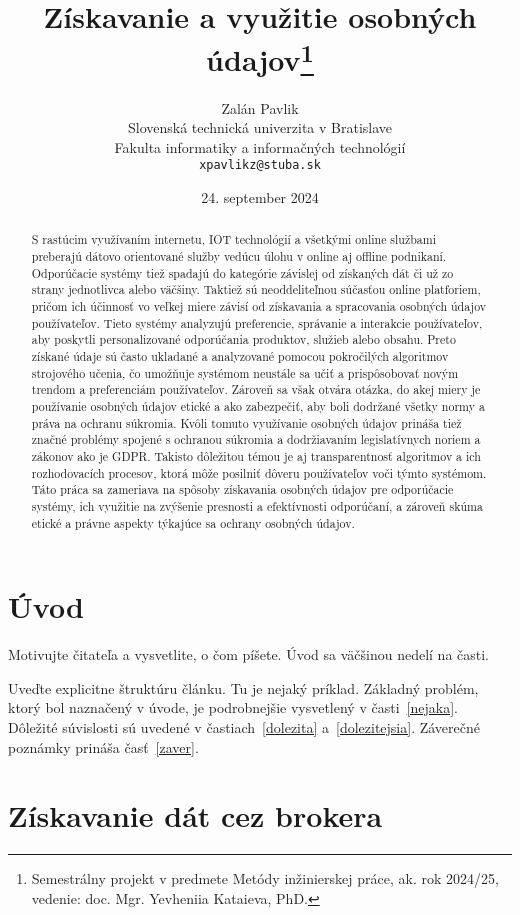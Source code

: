 \documentclass[10pt,twoside,slovak,a4paper]{article}
\title{Získavanie a využitie osobných údajov\thanks{Semestrálny projekt v predmete Metódy inžinierskej práce, ak. rok 2024/25, vedenie: doc. Mgr. Yevheniia Kataieva, PhD.}} %
\author{Zalán Pavlik\\[2pt]
	{\small Slovenská technická univerzita v Bratislave}\\
	{\small Fakulta informatiky a informačných technológií}\\
	{\small \texttt{xpavlikz@stuba.sk}}
	}
\date{\small 24. september 2024} %
\begin{document}
\maketitle

\begin{abstract}
S rastúcim využívaním internetu, IOT technológií a všetkými online
službami preberajú dátovo orientované služby vedúcu úlohu v online aj
offline podnikaní. Odporúčacie systémy tiež spadajú do kategórie závislej
od získaných dát či už zo strany jednotlivca alebo väčšiny. Taktiež sú neoddeliteľnou súčasťou online platforiem, pričom ich účinnosť vo veľkej miere
závisí od získavania a spracovania osobných údajov používateľov. Tieto
systémy analyzujú preferencie, správanie a interakcie používateľov, aby
poskytli personalizované odporúčania produktov, služieb alebo obsahu.
Preto získané údaje sú často ukladané a analyzované pomocou pokročilých algoritmov strojového učenia, čo umožňuje systémom neustále sa učiť
a prispôsobovať novým trendom a preferenciám používateľov. Zároveň sa
však otvára otázka, do akej miery je používanie osobných údajov etické
a ako zabezpečiť, aby boli dodržané všetky normy a práva na ochranu
súkromia. Kvôli tomuto využívanie osobných údajov prináša tiež značné
problémy spojené s ochranou súkromia a dodržiavaním legislatívnych noriem a zákonov ako je GDPR. Takisto dôležitou témou je aj transparentnosť algoritmov a ich rozhodovacích procesov, ktorá môže posilniť dôveru
používateľov voči týmto systémom. Táto práca sa zameriava na spôsoby
získavania osobných údajov pre odporúčacie systémy, ich využitie na zvýšenie presnosti a efektívnosti odporúčaní, a zároveň skúma etické a právne
aspekty týkajúce sa ochrany osobných údajov. \cite{key1} \cite{key2}
\end{abstract}


\newpage
\section{Úvod}

Motivujte čitateľa a vysvetlite, o čom píšete. Úvod sa väčšinou nedelí na časti.

Uveďte explicitne štruktúru článku. Tu je nejaký príklad.
Základný problém, ktorý bol naznačený v úvode, je podrobnejšie vysvetlený v časti~\ref{nejaka}.
Dôležité súvislosti sú uvedené v častiach~\ref{dolezita} a~\ref{dolezitejsia}.
Záverečné poznámky prináša časť~\ref{zaver}.



\section{Získavanie dát cez brokera} \label{broker}
\end{document}

